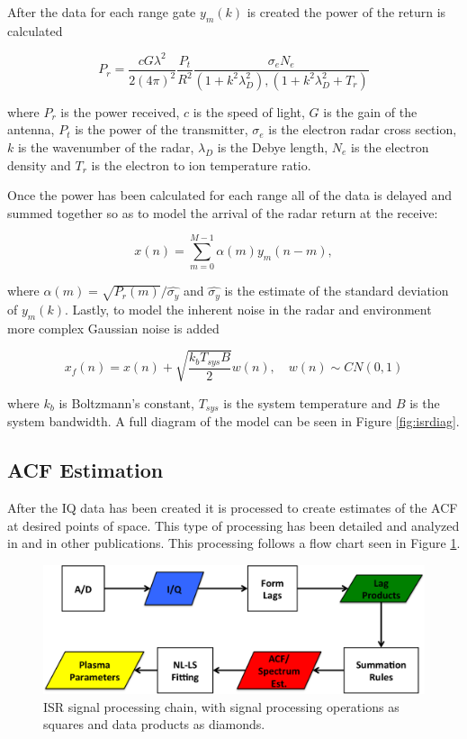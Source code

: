 \documentclass[draft,ras]{agutex}
\begin{document}
\begin{article}
After the data for each range gate $y_m(k)$ is created the power of the return is calculated

\begin{equation}
\label{eq3}
P_r = \frac{cG \lambda^2}{2(4\pi)^2}\frac{P_t }{R^2}\frac{\sigma_e N_e}{(1+k^2\lambda_D^2),(1+k^2\lambda_D^2 + T_r)}
\end{equation}
 
 \noindent where $P_r$ is the power received, $c$ is the speed of light, $G$ is the gain of the antenna, $P_t$ is the power of the transmitter, $\sigma_e$ is the electron radar cross section, $k$ is the wavenumber of the radar, $\lambda_D$ is the Debye length, $N_e$ is the electron density and $T_r$ is the electron to ion temperature ratio.
  
Once the power has been calculated for each range all of the data is delayed and summed together so as to model the arrival of the radar return at the receive: 
 
\begin{equation}
\label{eq4}
x(n) = \displaystyle\sum\limits_{m =0}^{M-1} \alpha(m)y_m(n-m),
\end{equation}

\noindent where $\alpha(m) = \sqrt{P_r(m)}/\hat{\sigma_y}$ and $\hat{\sigma_y}$ is the estimate of the standard deviation of $y_m(k)$. Lastly, to model the inherent noise in the radar and environment more complex Gaussian noise is added

\begin{equation}
\label{eq:addnoise}
x_f(n) = x(n) +\sqrt{\frac{k_bT_{sys}B}{2}} w(n), \quad w(n)\sim CN(0,1)
\end{equation}

\noindent where $k_b$ is Boltzmann's constant, $T_{sys}$ is the system temperature and $B$ is the system bandwidth.
A full diagram of the model can be seen in Figure \ref{fig:isrdiag}.


\subsection{ACF Estimation}

After the IQ data has been created it is processed to create estimates of the ACF at desired points of space. This type of processing has been detailed and analyzed in \citep{farley1969} and in other publications. This processing follows a flow chart seen in Figure \ref{fig:chain}.

\begin{figure}[!t]
\centering
\includegraphics[width=6in]{datastackchain}
\caption{ISR signal processing chain, with signal processing operations as squares and data products as diamonds.}
\label{fig:chain}
\end{figure}



\end{article}
\end{document}
